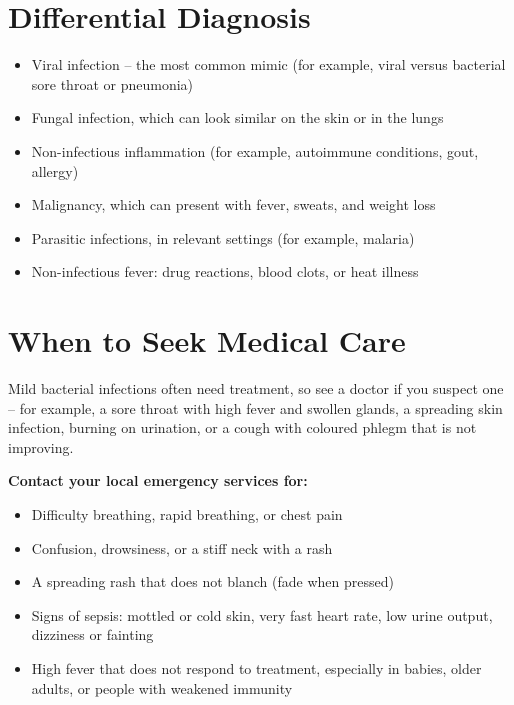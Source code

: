 \section*{Differential Diagnosis}
\begin{itemize}
    \item Viral infection -- the most common mimic (for example, viral versus bacterial sore throat or pneumonia)
    \item Fungal infection, which can look similar on the skin or in the lungs
    \item Non-infectious inflammation (for example, autoimmune conditions, gout, allergy)
    \item Malignancy, which can present with fever, sweats, and weight loss
    \item Parasitic infections, in relevant settings (for example, malaria)
    \item Non-infectious fever: drug reactions, blood clots, or heat illness
\end{itemize}

\section*{When to Seek Medical Care}
Mild bacterial infections often need treatment, so see a doctor if you suspect one -- for example, a sore throat with high fever and swollen glands, a spreading skin infection, burning on urination, or a cough with coloured phlegm that is not improving.

\textbf{Contact your local emergency services for:}
\begin{itemize}
    \item Difficulty breathing, rapid breathing, or chest pain
    \item Confusion, drowsiness, or a stiff neck with a rash
    \item A spreading rash that does not blanch (fade when pressed)
    \item Signs of sepsis: mottled or cold skin, very fast heart rate, low urine output, dizziness or fainting
    \item High fever that does not respond to treatment, especially in babies, older adults, or people with weakened immunity
\end{itemize}

